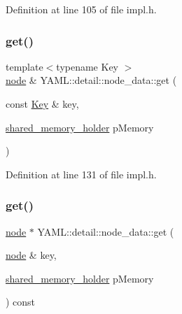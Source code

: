 Definition at line 105 of file impl.\+h.

\mbox{\label{class_y_a_m_l_1_1detail_1_1node__data_a0037d5cd297e625e56151089bf805108}} 
\subsubsection{\texorpdfstring{get()}{get()}\hspace{0.1cm}{\footnotesize\ttfamily [2/4]}}
{\footnotesize\ttfamily template$<$typename Key $>$ \\
\mbox{\hyperlink{class_y_a_m_l_1_1detail_1_1node}{node}} \& Y\+A\+M\+L\+::detail\+::node\+\_\+data\+::get (\begin{DoxyParamCaption}\item[{const \mbox{\hyperlink{namespace_y_a_m_l_a67c320aa50d3de7ecba1d0b8775dd684a1af533fc24b0311b8c4d5ac2870283aa}{Key}} \&}]{key,  }\item[{\mbox{\hyperlink{namespace_y_a_m_l_1_1detail_a228c4b3b6ba1058b474d40afc218e21d}{shared\+\_\+memory\+\_\+holder}}}]{p\+Memory }\end{DoxyParamCaption})\hspace{0.3cm}{\ttfamily [inline]}}



Definition at line 131 of file impl.\+h.

\mbox{\label{class_y_a_m_l_1_1detail_1_1node__data_ac1a3262f2fcb0a6a495b8b4e1360c8b8}} 
\subsubsection{\texorpdfstring{get()}{get()}\hspace{0.1cm}{\footnotesize\ttfamily [3/4]}}
{\footnotesize\ttfamily \mbox{\hyperlink{class_y_a_m_l_1_1detail_1_1node}{node}} $\ast$ Y\+A\+M\+L\+::detail\+::node\+\_\+data\+::get (\begin{DoxyParamCaption}\item[{\mbox{\hyperlink{class_y_a_m_l_1_1detail_1_1node}{node}} \&}]{key,  }\item[{\mbox{\hyperlink{namespace_y_a_m_l_1_1detail_a228c4b3b6ba1058b474d40afc218e21d}{shared\+\_\+memory\+\_\+holder}}}]{p\+Memory }\end{DoxyParamCaption}) const}



